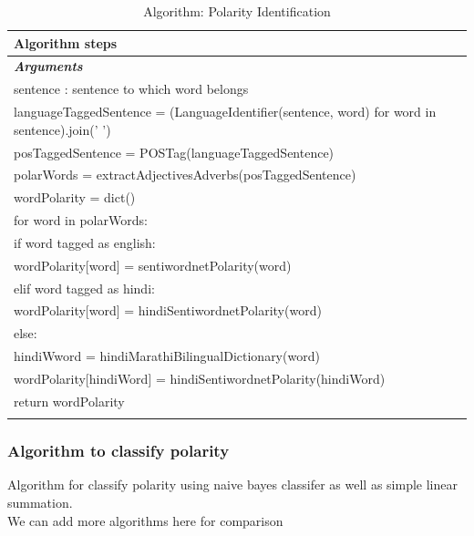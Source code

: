 \documentclass[12pt]{book}
\begin{document}
\begin{longtable}[c]{ |p{16cm}|  }
  \hline
  \textbf{Algorithm steps} \\
  \hline
  \endhead
  \textbf{\textit{Arguments}} \\
  \hline
  sentence : sentence to which word belongs\\
  \hline
  languageTaggedSentence = (LanguageIdentifier(sentence, word) for word in sentence).join(' ')\\
  posTaggedSentence = POSTag(languageTaggedSentence)\\
  polarWords = extractAdjectivesAdverbs(posTaggedSentence)\\
  wordPolarity = dict()\\
  for word in polarWords:\\
  \hspace{4em}if word tagged as english:\\
  \hspace{8em}wordPolarity[word] = sentiwordnetPolarity(word)\\
  \hspace{4em}elif word tagged as hindi:\\
  \hspace{8em}wordPolarity[word] = hindiSentiwordnetPolarity(word)\\
  \hspace{4em}else:\\
  \hspace{8em}hindiWword = hindiMarathiBilingualDictionary(word)\\
  \hspace{8em}wordPolarity[hindiWord] = hindiSentiwordnetPolarity(hindiWord)\\
  return wordPolarity\\
  \hline

  \caption{ Algorithm: Polarity Identification}\label{tab:tab_polarity_identifier}\\
\end{longtable}

\subsubsection{Algorithm to classify polarity}
Algorithm for classify polarity using naive bayes classifer as well as simple linear summation.\\
We can add more algorithms here for comparison
\end{document}
